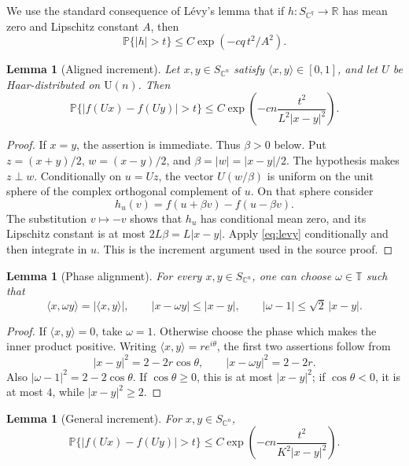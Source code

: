 \documentclass[11pt]{article}
\newtheorem{lemma}[theorem]{Lemma}
\theoremstyle{remark}
\newcommand{\C}{\mathbb C}
\newcommand{\R}{\mathbb R}
\newcommand{\T}{\mathbb T}
\begin{document}
We use the standard consequence of L\'evy's lemma that if
\(h:S_{\C^q}\to\R\) has mean zero and Lipschitz constant \(A\), then
\begin{equation}\label{eq:levy}
 \mathbb P\{|h|>t\}
 \leq C\exp\left(-c q\,t^2/A^2\right).
\end{equation}

\begin{lemma}[Aligned increment]\label{lem:aligned}
Let \(x,y\in S_{\C^n}\) satisfy
\(\langle x,y\rangle\in[0,1]\), and let \(U\) be Haar-distributed on
\(\mathrm U(n)\).  Then
\[
 \mathbb P\{|f(Ux)-f(Uy)|>t\}
 \leq C\exp\left(
 -c n\frac{t^2}{L^2|x-y|^2}\right).
\]
\end{lemma}

\begin{proof}
If \(x=y\), the assertion is immediate.  Thus \(\beta>0\) below.
Put \(z=(x+y)/2\), \(w=(x-y)/2\), and
\(\beta=|w|=|x-y|/2\).  The hypothesis makes \(z\perp w\).
Conditionally on \(u=Uz\), the vector \(U(w/\beta)\) is uniform on the unit
sphere of the complex orthogonal complement of \(u\).  On that sphere
consider
\[
 h_u(v)=f(u+\beta v)-f(u-\beta v).
\]
The substitution \(v\mapsto-v\) shows that \(h_u\) has conditional mean zero,
and its Lipschitz constant is at most \(2L\beta=L|x-y|\).  Apply
\eqref{eq:levy} conditionally and then integrate in \(u\).  This is the
increment argument used in the source proof.
\end{proof}

\begin{lemma}[Phase alignment]\label{lem:phase}
For every \(x,y\in S_{\C^n}\), one can choose \(\omega\in\T\) such that
\[
 \langle x,\omega y\rangle=|\langle x,y\rangle|,
 \qquad
 |x-\omega y|\leq|x-y|,
 \qquad
 |\omega-1|\leq\sqrt2\,|x-y|.
\]
\end{lemma}

\begin{proof}
If \(\langle x,y\rangle=0\), take \(\omega=1\).  Otherwise choose the phase
which makes the inner product positive.  Writing
\(\langle x,y\rangle=r e^{i\theta}\), the first two assertions follow from
\[
 |x-y|^2=2-2r\cos\theta,\qquad
 |x-\omega y|^2=2-2r.
\]
Also \(|\omega-1|^2=2-2\cos\theta\).  If \(\cos\theta\geq0\), this is at most
\(|x-y|^2\); if \(\cos\theta<0\), it is at most \(4\), while
\(|x-y|^2\geq2\).
\end{proof}

\begin{lemma}[General increment]\label{lem:general}
For \(x,y\in S_{\C^n}\),
\[
 \mathbb P\{|f(Ux)-f(Uy)|>t\}
 \leq C\exp\left(
 -c n\frac{t^2}{K^2|x-y|^2}\right).
\]
\end{lemma}
\end{document}
